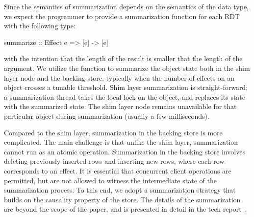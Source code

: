 Since the semantics of summarization depends on the semantics of the data type,
we expect the programmer to provide a summarization function for each RDT with
the following type:

\begin{codehaskell}
summarize :: Effect e => [e] -> [e]
\end{codehaskell}

\noindent with the intention that the length of the result is smaller that the
length of the argument. We utilize the  function to summarize the
object state both in the shim layer node and the backing store, typically when
the number of effects on an object crosses a tunable threshold. Shim layer
summarization is straight-forward; a summarization thread takes the local lock
on the object, and replaces its state with the summarized state. The shim layer
node remains unavailable for that particular object during summarization
(usually a few milliseconds).

Compared to the shim layer, summarization in the backing store is more
complicated. The main challenge is that unlike the shim layer, summarization
cannot run as an atomic operation. Summarization in the backing store involves
deleting previously inserted rows and inserting new rows, where each row
corresponds to an effect. It is essential that concurrent client operations are
permitted, but are not allowed to witness the intermediate state of the
summarization process. To this end, we adopt a summarization strategy that
builds on the causality property of the store. The details of the summarization
are beyond the scope of the paper, and is presented in detail in the tech
report~\cite{}.

